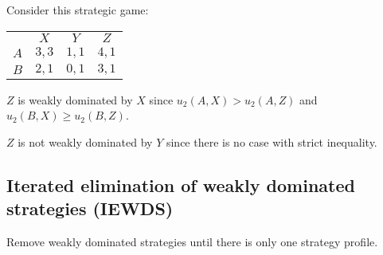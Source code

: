 \documentclass[12pt,letterpaper]{report}
\begin{document}
\begin{ex}
  Consider this strategic game:
  \begin{center}
    \renewcommand{\arraystretch}{1.25}
    \begin{tabular}{c |c|c|c|}
      \multicolumn{1}{c}{} & \multicolumn{1}{c}{$X$} & \multicolumn{1}{c}{$Y$}
        & \multicolumn{1}{c}{$Z$} \\
      \cline{2-4}
      $A$ & $3, 3$ & $1, 1$ & $4, 1$ \\
      \cline{2-4}
      $B$ & $2, 1$ & $0, 1$ & $3, 1$ \\
      \cline{2-4}
    \end{tabular}
  \end{center}

  $Z$ is weakly dominated by $X$ since $u_2(A, X) > u_2(A, Z)$ and $u_2(B, X) \geq u_2(B, Z)$.

  $Z$ is not weakly dominated by $Y$ since there is no case with strict inequality.
\end{ex}

\pagebreak
\subsection{Iterated elimination of weakly dominated strategies (IEWDS)}

Remove weakly dominated strategies until there is only one strategy profile.
\end{document}
